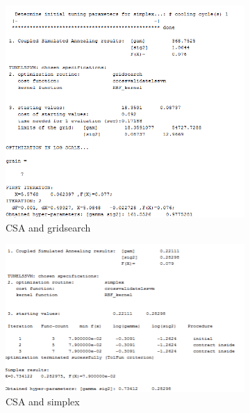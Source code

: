 \documentclass[11pt,oneside,a4paper]{article}
\begin{document}
\begin{figure}[H]
	\begin{subfigure}[b]{0.4\textwidth}
		\includegraphics[width=\textwidth]{../Figures/ripley_CSA_grid}
		\caption{CSA and gridsearch}
	\end{subfigure}
	\begin{subfigure}[b]{0.4\textwidth}
		\includegraphics[width=\textwidth]{../Figures/ripley_CSA_simp}
		\caption{CSA and simplex}
	\end{subfigure}
	\begin{subfigure}[b]{0.4\textwidth}

\end{subfigure}
\end{figure}
\end{document}
